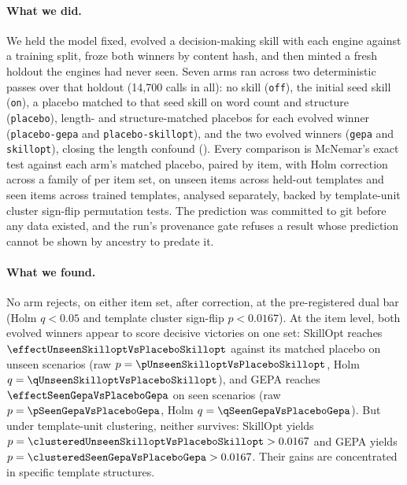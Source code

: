 \paragraph{What we did.}
We held the model fixed, evolved a decision-making skill with each engine
against a training split, froze both winners by content hash, and then
minted a fresh holdout the engines had never seen. Seven arms ran across two
deterministic passes over that holdout (14,700 calls in all): no skill
(\texttt{off}), the initial seed skill (\texttt{on}), a placebo matched to
that seed skill on word count and structure (\texttt{placebo}), length- and
structure-matched placebos for each evolved winner (\texttt{placebo-gepa} and
\texttt{placebo-skillopt}), and the two evolved winners (\texttt{gepa} and
\texttt{skillopt}), closing the length confound ().
Every comparison is McNemar's exact test against each arm's matched placebo,
paired by item, with Holm correction across a family of \NUM{\familySize} per
item set, on \NUM{\unseenItems} unseen items across \NUM{\templatesUnseen}
held-out templates and \NUM{\seenItems} seen items across \NUM{\templatesSeen}
trained templates, analysed separately, backed by template-unit cluster
sign-flip permutation tests. The prediction was committed to git before any data
existed, and the run's provenance gate refuses a result whose prediction cannot
be shown by ancestry to predate it.

\paragraph{What we found.}
No arm rejects, on either item set, after correction, at the pre-registered
dual bar (Holm $q < 0.05$ and template cluster sign-flip $p < 0.0167$).
At the item level, both evolved winners appear to score decisive victories on
one set: SkillOpt reaches $\NUM{\effectUnseenSkilloptVsPlaceboSkillopt}$ against
its matched placebo on unseen scenarios (raw $p = \NUM{\pUnseenSkilloptVsPlaceboSkillopt}$,
Holm $q = \NUM{\qUnseenSkilloptVsPlaceboSkillopt}$), and GEPA reaches
$\NUM{\effectSeenGepaVsPlaceboGepa}$ on seen scenarios (raw $p = \NUM{\pSeenGepaVsPlaceboGepa}$,
Holm $q = \NUM{\qSeenGepaVsPlaceboGepa}$). But under template-unit clustering,
neither survives: SkillOpt yields $p = \NUM{\clusteredUnseenSkilloptVsPlaceboSkillopt} > 0.0167$
and GEPA yields $p = \NUM{\clusteredSeenGepaVsPlaceboGepa} > 0.0167$.
Their gains are concentrated in specific template structures.

